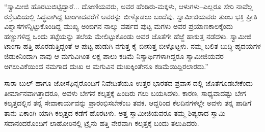 “ಸ್ವಾಮೀಜಿ ಹೊರಟುಬಿಟ್ಟಿದ್ದಾರೆ... ದೋಣಿಯವರು, ಅವರ ಹೆಂಡಿರು-ಮಕ್ಕಳು, ಆಳುಗಳು–ಎಲ್ಲರೂ ಸೇರಿ ನಾವೆಲ್ಲ ರಸ್ತೆಬದಿಯಲ್ಲಿ ಸಿದ್ಧವಾಗಿದ್ದ ಟಾಂಗಾದವರೆಗೆ ಅವರನ್ನು ಬೀಳ್ಕೊಡಲು ಬಂದೆವು. ಸ್ವಾಮೀಜಿಯವರು ತುಂಬ ಭಕ್ತಿ ಪ್ರೀತಿ ವಿಶ್ವಾಸಗಳನ್ನಿಟ್ಟುಕೊಂಡಿದ್ದ ಮುಖ್ಯ ಅಂಬಿಗನ ನಾಲ್ಕು ವರ್ಷದ ಪುಟ್ಟ ಮಗಳು ಅವರ ಪ್ರಯಾಣಕಾಲಕ್ಕೆಂದು ಹಣ್ಣುಗಳಿದ್ದ ಒಂದು ತಟ್ಟೆಯನ್ನು ತಲೆಯ ಮೇಲಿಟ್ಟುಕೊಂಡು ಅವರ ಜೊತೆಗೇ ಹೆಜ್ಜೆ ಹಾಕುತ್ತ ನಡೆದಳು. ಸ್ವಾಮೀಜಿ ಟಾಂಗಾ ಹತ್ತಿ ಹೊರಡುತ್ತಿದ್ದಂತೆ ಆ ಪುಟ್ಟ ಹುಡುಗಿ ನಗುತ್ತ ಕೈ ಬೀಸುತ್ತ ಬೀಳ್ಕೊಟ್ಟಳು. ನಮ್ಮ ಬಲಿತ ಬುದ್ಧಿ-ಹೃದಯಗಳ ಜಿಡುಕಿನಿಂದಾಗಿ ನಾವು ಆ ಮಗುವಿಗಿಂತ ಲಕ್ಷ ಪಾಲು ಕಡಿಮೆ ನಿಸ್ವಾರ್ಥಿಗಳಾಗಿದ್ದರೂ ಸ್ವಾಮೀಜಿಯವರ ಅಗಲುವಿಕೆಯಿಂದ ನಮಗಾದ ದುಃಖ ಆ ಮಗುವಿನ ದುಃಖಕ್ಕಿಂತೇನೂ ಕಡಿಮೆಯಿದ್ದಿರಲಾರದು.”

ಸಾರಾ ಬುಲ್ ಹಾಗೂ ಜೋಸೆಫಿನ್ನರೊಂದಿಗೆ ನಿವೇದಿತೆಯೂ ಉತ್ತರ ಭಾರತದ ಪ್ರವಾಸ ದಲ್ಲಿ ಜೊತೆಗೂಡಬೇಕೆಂದು ತೀರ್ಮಾನವಾಗಿತ್ತಾದರೂ, ಅವಳು ಬೇಗನೆ ಕಲ್ಕತ್ತಕ್ಕೆ ಹಿಂದಿರು ಗಲು ಬಯಸಿದಳು. ಕಾರಣ, ಸಾಧ್ಯವಾದಷ್ಟು ಬೇಗ ಕಲ್ಕತ್ತದಲ್ಲಿನ ತನ್ನ ಸೇವಾಕಾರ್ಯವನ್ನು ಪ್ರಾರಂಭಿಸಬೇಕೆಂಬ ತವಕ. ಆದ್ದರಿಂದ ಕೆಲದಿನಗಳಲ್ಲೇ ಅವಳು ತನ್ನ ಪಾಡಿಗೆ ತಾನು ಏಕಾಂಗಿ ಯಾಗಿ ಕಲ್ಕತ್ತದ ಕಡೆಗೆ ಹೊರಟಳು. ಅತ್ತ ಸ್ವಾಮೀಜಿಯವರೂ ತಮ್ಮ ಶಿಷ್ಯರಾದ ಸ್ವಾಮಿ ಸದಾನಂದರೊಂದಿಗೆ ಲಾಹೋರಿನಲ್ಲಿ ಟ್ರೈನು ಹತ್ತಿ ನೇರವಾಗಿ ಕಲ್ಕತ್ತಕ್ಕೆ ಬಂದು ತಲುಪಿದರು.

